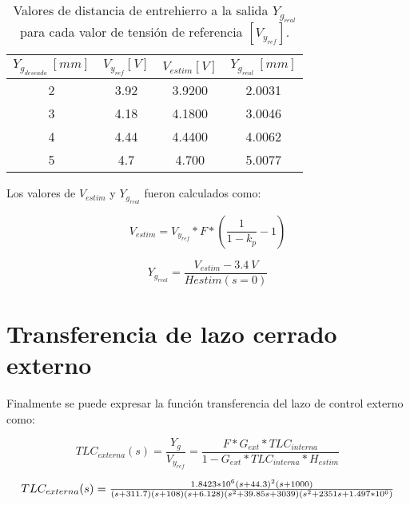\begin{table}[H]
	\begin{center}
		\begin{tabular}{| c | c | c | c |}
			\hline
			$Y_{g_{deseado}}\:[mm]$ & $V_{y_{ref}}[V]$& $V_{estim}[V]$& $Y_{g_{real}}\:[mm]$\\ \hline
			2 &	3.92 & 3.9200 & 2.0031 \\ \hline
			3 & 4.18 & 4.1800 & 3.0046\\ \hline
			4 & 4.44 & 4.4400 & 4.0062 \\ \hline
			5 & 4.7 & 4.700 & 5.0077\\ \hline	
		\end{tabular}
		\caption{Valores de distancia de entrehierro a la salida $Y_{g_{real}}$ para cada valor de tensión de referencia $[V_{y_{ref}}]$.}
		\label{tension-ref-vs-separacion-real}
	\end{center}
\end{table}

Los valores de $V_{estim}$ y $Y_{g_{real}}$ fueron calculados como:

\begin{equation}
	V_{estim}=V_{y_{ref}}*F*(\frac{1}{1-k_p}-1)
\end{equation}

\begin{equation}
	Y_{g_{real}}=\frac{V_{estim}-3.4\:V}{H{estim}(s=0)}
\end{equation}


\section{Transferencia de lazo cerrado externo}

Finalmente se puede expresar la función transferencia del lazo de control externo como:

\begin{equation}
	TLC_{externa}(s)=\frac{Y_g}{V_{y_{ref}}}=\frac{F*G_{ext}*TLC_{interna}}{1-G_{ext}*TLC_{interna}*H_{estim}}
\end{equation}

\begin{equation*}
\resizebox{.99\hsize}{!}
{
$
TLC_{externa}(s)=\frac{1.8423*10^6 (s+44.3)^2 (s+1000)}{(s+311.7) (s+108) (s+6.128) (s^2 + 39.85s + 3039) (s^2 + 2351s + 1.497*10^6 )}
$
}
\end{equation*}


